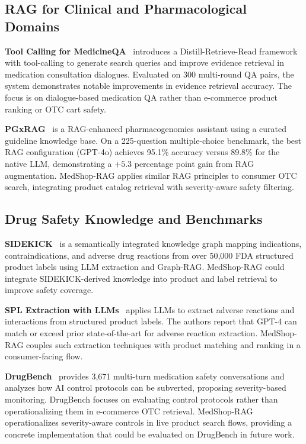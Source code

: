\documentclass[conference]{IEEEtran}
\begin{document}
\subsection{RAG for Clinical and Pharmacological Domains}

\textbf{Tool Calling for MedicineQA}~\cite{toolcalling} introduces a
Distill-Retrieve-Read framework with tool-calling to generate search queries and
improve evidence retrieval in medication consultation dialogues. Evaluated on 300
multi-round QA pairs, the system demonstrates notable improvements in evidence
retrieval accuracy. The focus is on dialogue-based medication QA rather than
e-commerce product ranking or OTC cart safety.

\textbf{PGxRAG}~\cite{pgxrag} is a RAG-enhanced pharmacogenomics assistant
using a curated guideline knowledge base. On a 225-question multiple-choice
benchmark, the best RAG configuration (GPT-4o) achieves 95.1\% accuracy versus
89.8\% for the native LLM, demonstrating a $+5.3$ percentage point gain from
RAG augmentation. MedShop-RAG applies similar RAG principles to consumer OTC
search, integrating product catalog retrieval with severity-aware safety filtering.

\subsection{Drug Safety Knowledge and Benchmarks}

\textbf{SIDEKICK}~\cite{sidekick} is a semantically integrated knowledge graph
mapping indications, contraindications, and adverse drug reactions from over
50,000 FDA structured product labels using LLM extraction and Graph-RAG.
MedShop-RAG could integrate SIDEKICK-derived knowledge into product and label
retrieval to improve safety coverage.

\textbf{SPL Extraction with LLMs}~\cite{splextraction} applies LLMs to extract
adverse reactions and interactions from structured product labels. The authors
report that GPT-4 can match or exceed prior state-of-the-art for adverse
reaction extraction. MedShop-RAG couples such extraction techniques with product
matching and ranking in a consumer-facing flow.

\textbf{DrugBench}~\cite{drugbench} provides 3,671 multi-turn medication safety
conversations and analyzes how AI control protocols can be subverted, proposing
severity-based monitoring. DrugBench focuses on evaluating control protocols
rather than operationalizing them in e-commerce OTC retrieval. MedShop-RAG
operationalizes severity-aware controls in live product search flows, providing
a concrete implementation that could be evaluated on DrugBench in future work.
\end{document}

